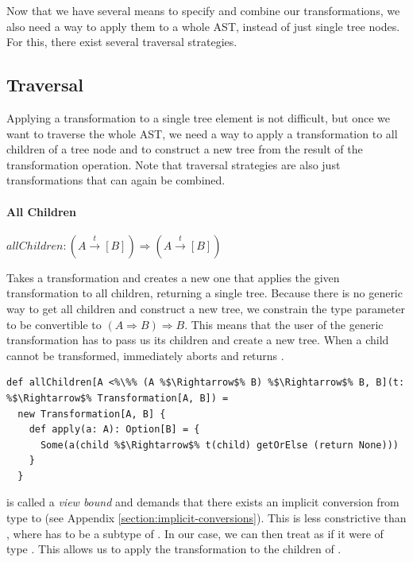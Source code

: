 Now that we have several means to specify and combine our transformations, we also need a way to apply them to a whole AST, instead of just single tree nodes. For this, there exist several traversal strategies.

\subsection{Traversal}

Applying a transformation to a single tree element is not difficult, but once we want to traverse the whole AST, we need a way to apply a transformation to all children of a tree node and to construct a new tree from the result of the transformation operation. Note that traversal strategies are also just transformations that can again be combined.

\paragraph{All Children} \hfill  $allChildren: (A \overset{t}{\rightarrow} [B]) \Rightarrow (A \overset{t}{\rightarrow} [B])$

\vspace{7pt} Takes a transformation and creates a new one that applies the given transformation to all children, returning a single tree. Because there is no generic way to get all children and construct a new tree, we constrain the type parameter  to be convertible to $(A \Rightarrow B) \Rightarrow B$. This means that the user of the generic transformation has to pass us its children and create a new tree. When a child cannot be transformed,  immediately aborts and returns .

\begin{lstlisting}
def allChildren[A <%\%% (A %$\Rightarrow$% B) %$\Rightarrow$% B, B](t: %$\Rightarrow$% Transformation[A, B]) = 
  new Transformation[A, B] {
    def apply(a: A): Option[B] = {
      Some(a(child %$\Rightarrow$% t(child) getOrElse (return None)))
    }
  }
\end{lstlisting}

 is called a \textit{view bound} and demands that there exists an implicit conversion from type  to  (see Appendix \vref{section:implicit-conversions}). This is less constrictive than , where  has to be a subtype of . In our case, we can then treat  as if it were of type . This allows us to apply the transformation to the children of .

